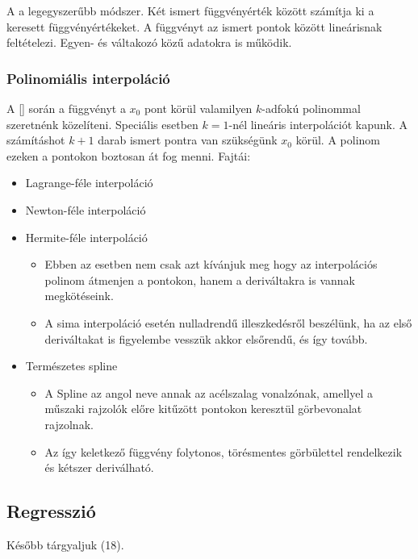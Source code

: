 \documentclass[../../main.tex]{subfiles}
\begin{document}
A  a legegyszerűbb módszer. Két ismert függvényérték
között számítja ki a keresett függvényértékeket. A függvényt az ismert pontok
között lineárisnak feltételezi. Egyen- és váltakozó közű adatokra is működik.

\subsubsection{Polinomiális interpoláció}

A [] során a függvényt a $x_0$ pont körül
valamilyen $k$-adfokú polinommal szeretnénk közelíteni. Speciális esetben
$k = 1$-nél lineáris interpolációt kapunk. A számításhot $k + 1$ darab
ismert pontra van szükségünk $x_0$ körül. A polinom ezeken a pontokon
boztosan át fog menni. Fajtái:
\begin{itemize}
  \item Lagrange-féle interpoláció
  \item Newton-féle interpoláció
  \item Hermite-féle interpoláció
        \begin{itemize}
          \item Ebben az esetben nem csak azt kívánjuk meg hogy az interpolációs
                polinom átmenjen a pontokon, hanem a deriváltakra is vannak
                megkötéseink.
          \item A sima interpoláció esetén nulladrendű illeszkedésről beszélünk,
                ha az első deriváltakat is figyelembe vesszük akkor elsőrendű,
                és így tovább.
        \end{itemize}
  \item Természetes spline
        \begin{itemize}
          \item A Spline az angol neve annak az acélszalag vonalzónak, amellyel
                a műszaki rajzolók előre kitűzött pontokon keresztül
                görbevonalat rajzolnak.
          \item Az így keletkező függvény folytonos, törésmentes görbülettel
                rendelkezik és kétszer deriválható.
        \end{itemize}
\end{itemize}

\subsection{Regresszió}

Később tárgyaljuk (18).
\end{document}
